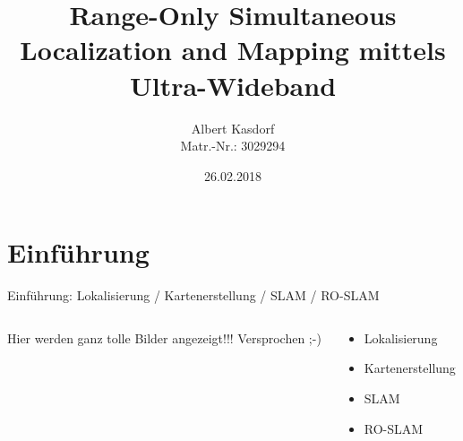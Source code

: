 \documentclass{beamer}
\title[RO-SLAM mittels UWB]{Range-Only Simultaneous Localization and Mapping mittels Ultra-Wideband}
\author[A. Kasdorf]
{
	Albert Kasdorf\\
	Matr.-Nr.: 3029294
}
\institute[FH Aachen]
{
	FH Aachen\\
	Fachbereich Elektrotechnik und Informationstechnik\\
	Ingenieur-Informatik
}
\date{26.02.2018}
\begin{document}
%
%
\frame{\titlepage}


%
%


%
% 
%
\part{Einführung}


%
%
\begin{frame}{Einführung: Lokalisierung / Kartenerstellung / SLAM / RO-SLAM}
	\begin{columns}
		\begin{column}{0.5\linewidth}
			Hier werden ganz tolle Bilder angezeigt!!! Versprochen ;-)
		\end{column}
		\vrule{}
		\begin{column}{0.5\linewidth}
			\begin{itemize}
				\item Lokalisierung
				\item Kartenerstellung
				\item SLAM
				\item RO-SLAM
			\end{itemize}
		\end{column}
	\end{columns}
\end{frame}
\end{document}
